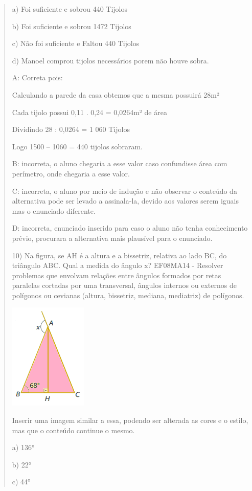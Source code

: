 \begin{quote}
\begin{escolha}
a) Foi suficiente e sobrou 440 Tijolos

b) Foi suficiente e sobrou 1472 Tijolos

c) Não foi suficiente e Faltou 440 Tijolos

d) Manoel comprou tijolos necessários porem não houve sobra.

A: Correta pois:

Calculando a parede da casa obtemos que a mesma possuirá 28m²

Cada tijolo possui 0,11 . 0,24 = 0,0264m² de área

Dividindo 28 : 0,0264 = 1 060 Tijolos

Logo 1500 -- 1060 = 440 tijolos sobraram.

B: incorreta, o aluno chegaria a esse valor caso confundisse área com
perímetro, onde chegaria a esse valor.

C: incorreta, o aluno por meio de indução e não observar o conteúdo da
alternativa pode ser levado a assinala-la, devido aos valores serem
iguais mas o enunciado diferente.

D: incorreta, enunciado inserido para caso o aluno não tenha
conhecimento prévio, procurara a alternativa mais plausível para o
enunciado.

10) Na figura, se AH é a altura e a bissetriz, relativa ao lado BC, do
triângulo ABC. Qual a medida do ângulo x? EF08MA14 - Resolver problemas
que envolvam relações entre ângulos formados por retas paralelas
cortadas por uma transversal, ângulos internos ou externos de polígonos
ou cevianas (altura, bissetriz, mediana, mediatriz) de polígonos.

\includegraphics[width=1.45833in,height=2in]{./imgSAEB_8_MAT/media/image58.png}

Inserir uma imagem similar a essa, podendo ser alterada as cores e o
estilo, mas que o conteúdo continue o mesmo.

a) 136°

b) 22°

c) 44°


\end{escolha}
\end{quote}
